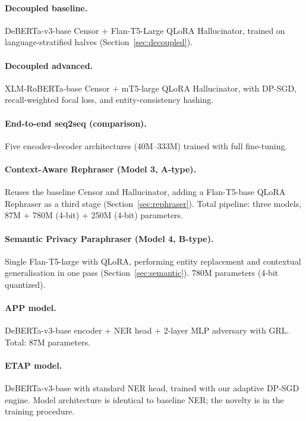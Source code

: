 \documentclass[11pt,a4paper]{article}
\begin{document}
\paragraph{Decoupled baseline.}
DeBERTa-v3-base Censor + Flan-T5-Large QLoRA Hallucinator, trained on
language-stratified halves (Section~\ref{sec:decoupled}).

\paragraph{Decoupled advanced.}
XLM-RoBERTa-base Censor + mT5-large QLoRA Hallucinator, with DP-SGD,
recall-weighted focal loss, and entity-consistency hashing.

\paragraph{End-to-end seq2seq (comparison).}
Five encoder-decoder architectures (40M--333M) trained with full fine-tuning.

\paragraph{Context-Aware Rephraser (Model 3, A-type).}
Reuses the baseline Censor and Hallucinator, adding a Flan-T5-base QLoRA
Rephraser as a third stage (Section~\ref{sec:rephraser}).  Total pipeline:
three models, 87M + 780M (4-bit) + 250M (4-bit) parameters.

\paragraph{Semantic Privacy Paraphraser (Model 4, B-type).}
Single Flan-T5-large with QLoRA, performing entity replacement and contextual
generalisation in one pass (Section~\ref{sec:semantic}).  780M parameters
(4-bit quantized).

\paragraph{APP model.}
DeBERTa-v3-base encoder + NER head + 2-layer MLP adversary with GRL.
Total: 87M parameters.

\paragraph{ETAP model.}
DeBERTa-v3-base with standard NER head, trained with our adaptive DP-SGD
engine.  Model architecture is identical to baseline NER; the novelty is in
the training procedure.
\end{document}
